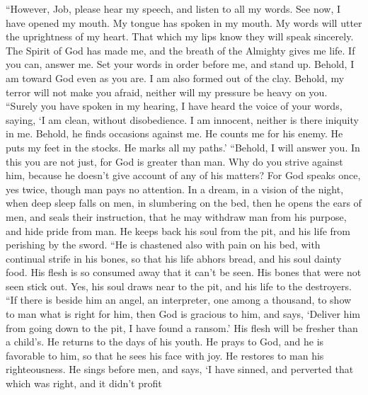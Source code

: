  ``However, Job, please hear my speech, and listen to all
my words.  See now, I have opened my mouth. My tongue has
spoken in my mouth.  My words will utter the uprightness
of my heart. That which my lips know they will speak sincerely.
 The Spirit of God has made me, and the breath of the
Almighty gives me life.  If you can, answer me. Set your
words in order before me, and stand up.  Behold, I am
toward God even as you are. I am also formed out of the clay.
 Behold, my terror will not make you afraid, neither will
my pressure be heavy on you.  ``Surely you have spoken in
my hearing, I have heard the voice of your words, saying, 
`I am clean, without disobedience. I am innocent, neither is there
iniquity in me.  Behold, he finds occasions against me.
He counts me for his enemy.  He puts my feet in the
stocks. He marks all my paths.'  ``Behold, I will answer
you. In this you are not just, for God is greater than man.
 Why do you strive against him, because he doesn't give
account of any of his matters?  For God speaks once, yes
twice, though man pays no attention.  In a dream, in a
vision of the night, when deep sleep falls on men, in slumbering on the
bed,  then he opens the ears of men, and seals their
instruction,  that he may withdraw man from his purpose,
and hide pride from man.  He keeps back his soul from the
pit, and his life from perishing by the sword.  ``He is
chastened also with pain on his bed, with continual strife in his bones,
 so that his life abhors bread, and his soul dainty food.
 His flesh is so consumed away that it can't be seen. His
bones that were not seen stick out.  Yes, his soul draws
near to the pit, and his life to the destroyers.  ``If
there is beside him an angel, an interpreter, one among a thousand, to
show to man what is right for him,  then God is gracious
to him, and says, `Deliver him from going down to the pit, I have found
a ransom.'  His flesh will be fresher than a child's. He
returns to the days of his youth.  He prays to God, and
he is favorable to him, so that he sees his face with joy. He restores
to man his righteousness.  He sings before men, and says,
`I have sinned, and perverted that which was right, and it didn't profit
